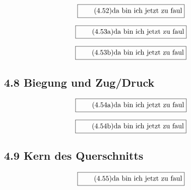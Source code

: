 \documentclass[11pt]{article}
\newcommand{\1}{ {\mathds{1}} }
\begin{document}
    \begin{equation}
      \boxed{
        \tag{4.52}
        \begin{split}
          \text{da bin ich jetzt zu faul}
        \end{split}
      }
    \end{equation}

    \begin{equation}
      \boxed{
        \tag{4.53a}
        \begin{split}
          \text{da bin ich jetzt zu faul}
        \end{split}
      }
    \end{equation}

    \begin{equation}
      \boxed{
        \tag{4.53b}
        \begin{split}
          \text{da bin ich jetzt zu faul}
        \end{split}
      }
    \end{equation}

    \subsection*{4.8 Biegung und Zug/Druck}

    \begin{equation}
      \boxed{
        \tag{4.54a}
        \begin{split}
          \text{da bin ich jetzt zu faul}
        \end{split}
      }
    \end{equation}
    
    \begin{equation}
      \boxed{
        \tag{4.54b}
        \begin{split}
          \text{da bin ich jetzt zu faul}
        \end{split}
      }
    \end{equation}
    
    \subsection*{4.9 Kern des Querschnitts}

    \begin{equation}
      \boxed{
        \tag{4.55}
        \begin{split}
          \text{da bin ich jetzt zu faul}
        \end{split}
      }
    \end{equation}
    
\end{document}
